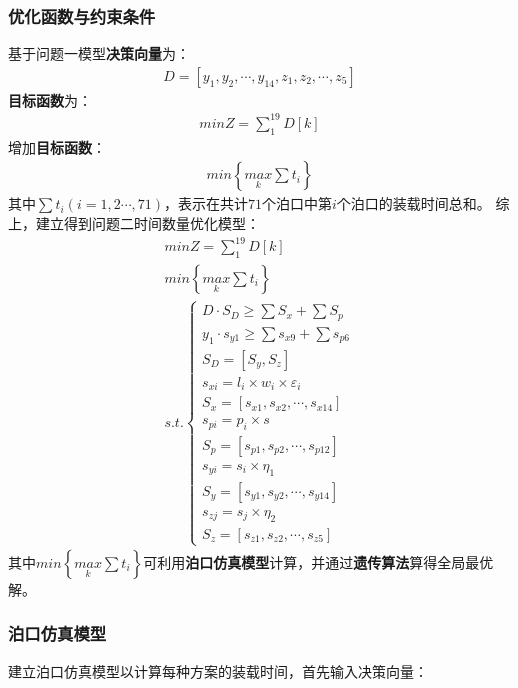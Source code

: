 \documentclass{whutmod}
\begin{document}
	    \subsubsection{优化函数与约束条件}
	基于问题一模型\textbf{决策向量}为：
	\begin{gather*}
	D=[y_{1},y_{2},\cdots,y_{14},z_{1},z_{2},\cdots,z_{5}]
	\end{gather*}
	\textbf{目标函数}为：
	\begin{gather}
	min Z=\sum _{1}^{19}D[k]
	\end{gather}
	增加\textbf{目标函数}：
		\begin{gather}
	min \left \{ \underset{k}{max}\sum t_{i} \right \}
	\end{gather}
	其中$\sum t_{i}(i=1,2\cdots,71)$，表示在共计$71$个泊口中第$i$个泊口的装载时间总和。	
		综上，建立得到问题二时间数量优化模型：
	\begin{gather}
	min Z=\sum _{1}^{19}D[k]\\
	min \left \{ \underset{k}{max}\sum t_{i} \right \}\\
	s.t.\left\{\begin{matrix}	 D\cdot S_{D}\geq \sum  S_{x} + \sum  S_{p}
	\\ y_{1}\cdot s_{y1}\geq \sum s_{x9}+ \sum  s_{p6}
	\\S_{D}=[S_{y}, S_{z}]
	\\ s_{xi}=l_{i}\times w_{i} \times \varepsilon _{i}
	\\S_{x}=[s_{x1},s_{x2},\cdots,s_{x14}]
	\\s_{pi}=p_{i}\times s
	\\S_{p}=[s_{p1},s_{p2},\cdots,s_{p12}]
	\\     s_{yi}=s_{i}\times \eta_{1}
	\\   S_{y}=[s_{y1},s_{y2},\cdots,s_{y14}]
	\\      s_{zj}=s_{j}\times \eta_{2}
	\\ S_{z}=[s_{z1},s_{z2},\cdots,s_{z5}]
	\end{matrix}\right. 
	\end{gather}
	其中$min \left \{ \underset{k}{max}\sum t_{i} \right \}$可利用\textbf{泊口仿真模型}计算，并通过\textbf{遗传算法}算得全局最优解。
	\subsubsection{泊口仿真模型}
	建立泊口仿真模型以计算每种方案的装载时间，首先输入决策向量：
\end{document}
